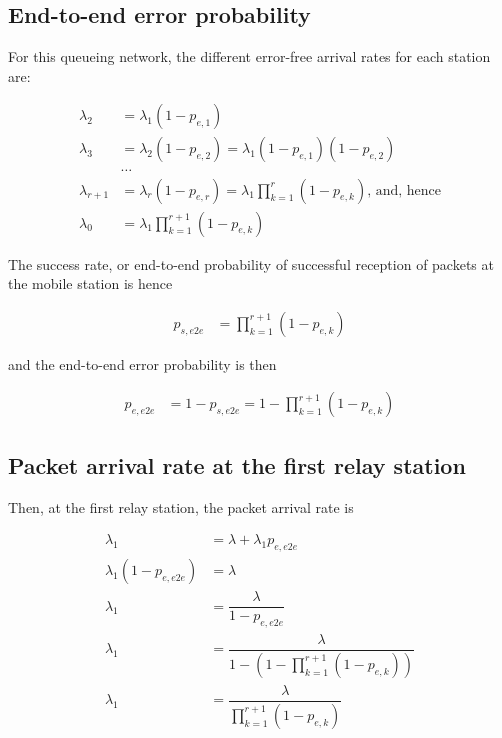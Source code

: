 \subsection{End-to-end error probability}
For this queueing network, the different error-free arrival rates for each
station are:

\begin{align*}
  \lambda_2 &= \lambda_1 (1 - p_{e,1}) \\
  \lambda_3 &= \lambda_2 (1 - p_{e,2}) = \lambda_1 (1 - p_{e,1}) (1 - p_{e,2}) \\
  & \dots \\
  \lambda_{r+1} &= \lambda_r (1-p_{e,r}) = \lambda_1 \prod_{k=1}^{r} (1 - p_{e,k})
  \text{, and, hence} \\
  \lambda_0 &= \lambda_1 \prod_{k=1}^{r+1} (1 - p_{e,k})
\end{align*}

The success rate, or end-to-end probability of successful reception of packets at
the mobile station is hence

\begin{align*}
  p_{s,e2e} &= \prod_{k=1}^{r+1} (1 - p_{e,k})
\end{align*}

and the end-to-end error probability is then

\begin{align*}
  p_{e,e2e} &= 1 - p_{s,e2e} = 1 - \prod_{k=1}^{r+1} (1 - p_{e,k})
\end{align*}


\subsection{Packet arrival rate at the first relay station}

Then, at the first relay station, the packet arrival rate is

\begin{align*}
  \lambda_1 &= \lambda + \lambda_1 p_{e,e2e} \\
  \lambda_1 (1-p_{e,e2e}) &= \lambda  \\
  \lambda_1 &= \dfrac{\lambda}{1-p_{e,e2e}} \\
  \lambda_1 &= \dfrac{\lambda}{1 - (1 - \prod\limits_{k=1}^{r+1} (1 - p_{e,k}))} \\
  \lambda_1 &= \dfrac{\lambda}{\prod\limits_{k=1}^{r+1} (1 - p_{e,k})}
\end{align*}



